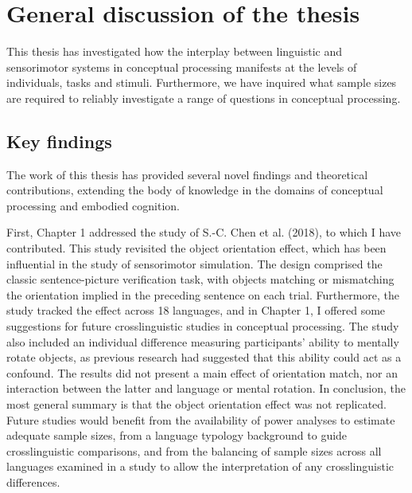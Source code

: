 \documentclass[
  12pt,
  man,floatsintext]{apa7}
\begin{document}
\clearpage

\hypertarget{general-discussion-of-the-thesis}{%
\section{General discussion of the thesis}\label{general-discussion-of-the-thesis}}

This thesis has investigated how the interplay between linguistic and sensorimotor systems in conceptual processing manifests at the levels of individuals, tasks and stimuli. Furthermore, we have inquired what sample sizes are required to reliably investigate a range of questions in conceptual processing.

\hypertarget{key-findings}{%
\subsection{Key findings}\label{key-findings}}

The work of this thesis has provided several novel findings and theoretical contributions, extending the body of knowledge in the domains of conceptual processing and embodied cognition.

First, Chapter 1 addressed the study of S.-C. Chen et al. (2018), to which I have contributed. This study revisited the object orientation effect, which has been influential in the study of sensorimotor simulation. The design comprised the classic sentence-picture verification task, with objects matching or mismatching the orientation implied in the preceding sentence on each trial. Furthermore, the study tracked the effect across 18 languages, and in Chapter 1, I offered some suggestions for future crosslinguistic studies in conceptual processing. The study also included an individual difference measuring participants' ability to mentally rotate objects, as previous research had suggested that this ability could act as a confound. The results did not present a main effect of orientation match, nor an interaction between the latter and language or mental rotation. In conclusion, the most general summary is that the object orientation effect was not replicated. Future studies would benefit from the availability of power analyses to estimate adequate sample sizes, from a language typology background to guide crosslinguistic comparisons, and from the balancing of sample sizes across all languages examined in a study to allow the interpretation of any crosslinguistic differences.
\end{document}
